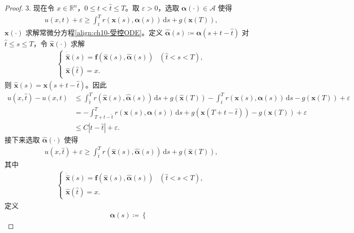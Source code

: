 \documentclass[../../main.tex]{subfiles}
\begin{document}
\begin{proof}
3. 现在令 $x\in\mathbb{R}^n$，$0\leqslant t<\widehat{t}\leqslant T$。取 $\varepsilon>0$，选取 $\boldsymbol{\alpha}(\cdot)\in\mathcal{A}$ 使得
\begin{align*}
u(x,t)+\varepsilon\geqslant \int_t^T r(\mathbf{x}(s),\boldsymbol{\alpha}(s))\,\mathrm{d}s+g(\mathbf{x}(T)),
\end{align*}
$\mathbf{x}(\cdot)$ 求解常微分方程\eqref{align:ch10-受控ODE}。定义 $\widehat{\boldsymbol{\alpha}}(s)\coloneqq\boldsymbol{\alpha}(s+t-\widehat{t})$ 对 $\widehat{t}\leqslant s\leqslant T$，令 $\widehat{\mathbf{x}}(\cdot)$ 求解
\begin{align*}
\begin{cases}
\dot{\widehat{\mathbf{x}}}(s)=\mathbf{f}(\widehat{\mathbf{x}}(s),\widehat{\boldsymbol{\alpha}}(s)) & (\widehat{t}<s<T),\\
\widehat{\mathbf{x}}(\widehat{t})=x.
\end{cases}
\end{align*}
则 $\widehat{\mathbf{x}}(s)=\mathbf{x}(s+t-\widehat{t})$。因此
\begin{align}
u(x,\widehat{t})-u(x,t) &\leqslant \int_{\widehat{t}}^T r(\widehat{\mathbf{x}}(s),\widehat{\boldsymbol{\alpha}}(s))\,\mathrm{d}s+g(\widehat{\mathbf{x}}(T))-\int_t^T r(\mathbf{x}(s),\boldsymbol{\alpha}(s))\,\mathrm{d}s-g(\mathbf{x}(T))+\varepsilon\nonumber\\
&= -\int_{T+t-\widehat{t}}^T r(\mathbf{x}(s),\boldsymbol{\alpha}(s))\,\mathrm{d}s+g(\mathbf{x}(T+t-\widehat{t}))-g(\mathbf{x}(T))+\varepsilon\nonumber\\
&\leqslant C|t-\widehat{t}|+\varepsilon.
\label{align:ch10-时间差估计1}
\end{align}
接下来选取 $\widehat{\boldsymbol{\alpha}}(\cdot)$ 使得
\begin{align*}
u(x,\widehat{t})+\varepsilon\geqslant \int_{\widehat{t}}^T r(\widehat{\mathbf{x}}(s),\widehat{\boldsymbol{\alpha}}(s))\,\mathrm{d}s+g(\widehat{\mathbf{x}}(T)),
\end{align*}
其中
\begin{align*}
\begin{cases}
\dot{\widehat{\mathbf{x}}}(s)=\mathbf{f}(\widehat{\mathbf{x}}(s),\widehat{\boldsymbol{\alpha}}(s)) & (\widehat{t}<s<T),\\
\widehat{\mathbf{x}}(\widehat{t})=x.
\end{cases}
\end{align*}
定义
\begin{align*}
\boldsymbol{\alpha}(s)\coloneqq
\begin{cases}

\end{cases}
\end{align*}
\end{proof}
\end{document}

